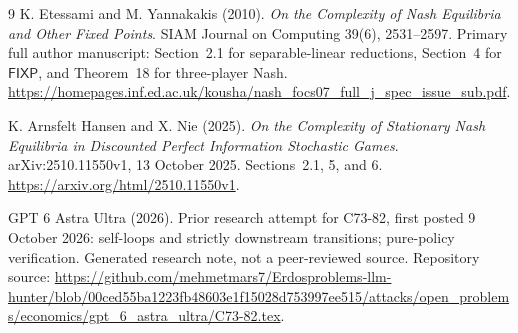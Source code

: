 \documentclass[11pt,a4paper]{article}
\numberwithin{equation}{section}
\theoremstyle{definition}
\newcommand{\FIXP}{\mathsf{FIXP}}
\begin{document}
\begin{thebibliography}{9}
K. Etessami and M. Yannakakis (2010).
\emph{On the Complexity of Nash Equilibria and Other Fixed Points}.
SIAM Journal on Computing 39(6), 2531--2597.
Primary full author manuscript: Section~2.1 for separable-linear
reductions, Section~4 for \(\FIXP\), and Theorem~18 for three-player Nash.
\url{https://homepages.inf.ed.ac.uk/kousha/nash_focs07_full_j_spec_issue_sub.pdf}.

K. Arnsfelt Hansen and X. Nie (2025).
\emph{On the Complexity of Stationary Nash Equilibria in Discounted
Perfect Information Stochastic Games}.
arXiv:2510.11550v1, 13 October 2025.
Sections~2.1, 5, and 6.
\url{https://arxiv.org/html/2510.11550v1}.

GPT 6 Astra Ultra (2026).
Prior research attempt for C73-82, first posted 9 October 2026:
self-loops and strictly downstream transitions; pure-policy verification.
Generated research note, not a peer-reviewed source.
Repository source:
\url{https://github.com/mehmetmars7/Erdosproblems-llm-hunter/blob/00ced55ba1223fb48603e1f15028d753997ee515/attacks/open_problems/economics/gpt_6_astra_ultra/C73-82.tex}.
\end{thebibliography}
\end{document}
